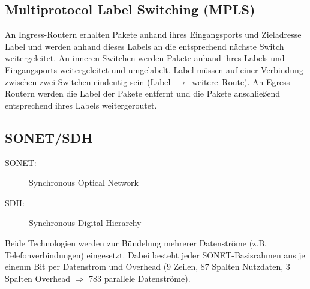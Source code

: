\documentclass[a4paper]{article}
\begin{document}
\subsection{Multiprotocol Label Switching (MPLS)}
An Ingress-Routern erhalten Pakete anhand ihres Eingangsports und Zieladresse Label und werden anhand dieses Labels an die entsprechend nächste Switch weitergeleitet. An inneren Switchen werden Pakete anhand ihres Labels und Eingangsports weitergeleitet und umgelabelt. Label müssen auf einer Verbindung zwischen zwei Switchen eindeutig sein (Label~$\to$~weitere~Route). An Egress-Routern werden die Label der Pakete entfernt und die Pakete anschließend entsprechend ihres Labels weitergeroutet.

\subsection{SONET/SDH}
\begin{description}
    \item[SONET:] Synchronous Optical Network
    \item[SDH:] Synchronous Digital Hierarchy
\end{description}
Beide Technologien werden zur Bündelung mehrerer Datenströme (z.B. Telefonverbindungen) eingesetzt. Dabei besteht jeder SONET-Basisrahmen aus je einenm Bit per Datenstrom und Overhead (9 Zeilen, 87 Spalten Nutzdaten, 3 Spalten Overhead $\Rightarrow$ 783 parallele Datenströme).
\end{document}
